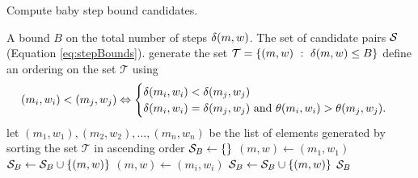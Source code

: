 \documentclass{ucalgthes1}
\theoremstyle{definition}
\begin{document}
\begin{algorithm}[htb]
\caption{Compute baby step bound candidates.}
\label{alg:stepBounds}
\begin{algorithmic}[1]
\Require A bound $B$ on the total number of steps $\delta(m, w)$.
\Ensure The set of candidate pairs $\mathcal S$ (Equation \ref{eq:stepBounds}).
\State generate the set $\mathcal T = \{(m, w) ~:~ \delta(m, w) \le B\}$
\State define an ordering on the set $\mathcal T$ using
\[
(m_i, w_i) < (m_j, w_j) \Leftrightarrow \begin{cases}
	\delta(m_i, w_i) < \delta(m_j, w_j) \\
	\delta(m_i, w_i) = \delta(m_j, w_j) \textrm{ and } \theta(m_i, w_i) > \theta(m_j, w_j).
\end{cases}
\]
\State let $(m_1, w_1), (m_2, w_2), ..., (m_n, w_n)$ be the list of elements generated by sorting the set $\mathcal T$ in ascending order
\State $\mathcal S_B \gets \{\}$
\State $(m, w) \gets (m_1, w_1)$
		\State $\mathcal S_B \gets \mathcal S_B \cup \{(m, w)\}$
		\State $(m, w) \gets (m_i, w_i)$
	\EndIf
\EndFor
\State $\mathcal S_B \gets \mathcal S_B \cup \{(m, w)\}$
\State \Return $\mathcal S_B$
\end{algorithmic}
\end{algorithm}
\end{document}
